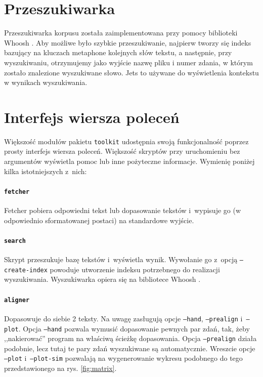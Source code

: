 \documentclass{pracamgr}
\begin{document}
\section{Przeszukiwarka}

Przeszukiwarka korpusu została zaimplementowana przy pomocy biblioteki
Whoosh \cite{whoosh}. Aby możliwe było szybkie przeszukiwanie,
najpierw tworzy się indeks bazujący na kluczach metaphone kolejnych
słów tekstu, a następnie, przy wyszukiwaniu, otrzymujemy jako wyjście
nazwę pliku i numer zdania, w którym zostało znalezione wyszukiwane
słowo. Jets to używane do wyświetlenia kontekstu w wynikach wyszukiwania.


\section{Interfejs wiersza poleceń}\label{r:cli}

Większość modułów pakietu {\tt toolkit} udostępnia swoją
funkcjonalność poprzez prosty interfejs wiersza poleceń. Większość
skryptów przy uruchomieniu bez argumentów wyświetla pomoc lub inne
pożyteczne informacje. Wymienię poniżej kilka istotniejszych z~nich:

\paragraph{{\tt fetcher}}
Fetcher pobiera odpowiedni tekst lub dopasowanie tekstów i~wypisuje go
(w odpowiednio sformatowanej postaci) na standardowe wyjście.

\paragraph{{\tt search}}
Skrypt przeszukuje bazę tekstów i~wyświetla wynik. Wywołanie go
z~opcją {\tt --create-index} powoduje utworzenie indeksu potrzebnego do
realizacji wyszukiwania. Wyszukiwarka opiera się na bibliotece Whoosh
\cite{whoosh}.

\paragraph{{\tt aligner}}
Dopasowuje do siebie 2 teksty. Na uwagę zasługują opcje {\tt --hand},
{\tt --prealign} i~{\tt --plot}. Opcja {\tt --hand} pozwala wymusić
dopasowanie pewnych par zdań, tak, żeby ,,nakierować'' program na
właściwą ścieżkę dopasowania. Opcja {\tt --prealign} działa podobnie,
lecz tutaj te pary zdań wyszukiwane są automatycznie. Wreszcie opcje
{\tt --plot} i~{\tt --plot-sim} pozwalają na wygenerowanie wykresu
podobnego do tego przedstawionego na rys. \ref{fig:matrix}.
\end{document}
